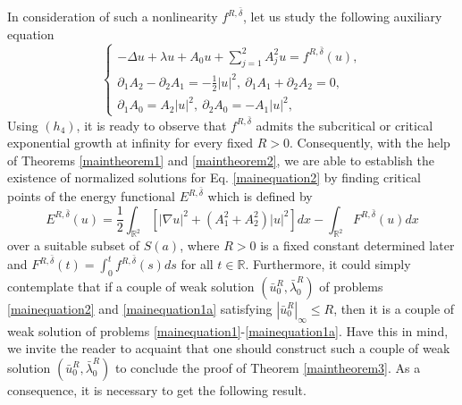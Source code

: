 \documentclass[11pt]{amsart}
\numberwithin{equation}{section}
\theoremstyle{definition}
\newcommand{\R}{\mathbb{R}}
\begin{document}
In consideration of such a nonlinearity $f^{R,\bar{\delta}}$, let us study the following auxiliary equation
\begin{equation}\label{mainequation2}
    \left\{
  \begin{array}{ll}
\displaystyle    -\Delta u +\lambda u+A_0 u+\sum\limits_{j=1}^2A_j^2 u= f^{R,\bar{\delta}}(u), \\
 \displaystyle     \partial_1A_2-\partial_2A_1=-\frac{1}{2}|u|^2,~\partial_1A_1+\partial_2A_2=0,\\
 \displaystyle    \partial_1A_0=A_2|u|^2,~ \partial_2A_0=-A_1|u|^2,
  \end{array}
\right.
\end{equation}
Using $(h_4)$, it is ready to observe that $f^{R,\bar{\delta}}$
admits the
subcritical or critical exponential growth at infinity for every fixed $R > 0$.
Consequently, with the help of Theorems \ref{maintheorem1} and \ref{maintheorem2},
we are able to establish the existence of normalized solutions for Eq. \eqref{mainequation2}
by finding critical points of the energy functional $E^{R,\bar{\delta}}$ which is defined by
\begin{equation}\label{functional2}
E^{R,\bar{\delta}}(u)=\frac12\int_{\R^2}[|\nabla u|^2 + (A_1^2+A_2^2)|u|^2]dx-\int_{\R^2}F^{R,\bar{\delta}}(u)dx
\end{equation}
over a suitable subset of $S(a)$,
where $R>0$ is a fixed constant determined later and $F^{R,{\bar\delta}}(t)=\int_0^tf^{R,{\bar\delta}}(s)ds$ for all $t\in\R$.
Furthermore, it could simply contemplate that if a couple of weak solution
$(\bar{u}_0^R,\bar{\lambda}_0^R)$ of problems \eqref{mainequation2} and \eqref{mainequation1a}
satisfying $|\bar{u}_0^R|_\infty\leq R$, then it is a
couple of weak solution of problems \eqref{mainequation1}-\eqref{mainequation1a}.
Have this in mind, we invite the reader to acquaint that one should
construct such a couple of weak solution
$(\bar{u}_0^R,\bar{\lambda}_0^R)$
to conclude the proof of Theorem \ref{maintheorem3}. As a consequence, it is necessary to get the following result.
\end{document}
